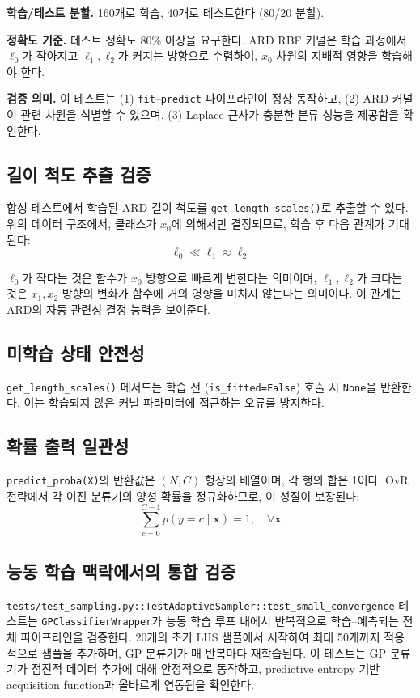 \documentclass[11pt]{article}
\begin{document}
\textbf{학습/테스트 분할.}
160개로 학습, 40개로 테스트한다 (80/20 분할).

\textbf{정확도 기준.}
테스트 정확도 80\% 이상을 요구한다.
ARD RBF 커널은 학습 과정에서 $\ell_0$가 작아지고 $\ell_1, \ell_2$가 커지는 방향으로 수렴하여,
$x_0$ 차원의 지배적 영향을 학습해야 한다.

\textbf{검증 의미.}
이 테스트는 (1) \texttt{fit}--\texttt{predict} 파이프라인이 정상 동작하고,
(2) ARD 커널이 관련 차원을 식별할 수 있으며,
(3) Laplace 근사가 충분한 분류 성능을 제공함을 확인한다.


\subsection{길이 척도 추출 검증}

합성 테스트에서 학습된 ARD 길이 척도를 \texttt{get\_length\_scales()}로 추출할 수 있다.
위의 데이터 구조에서, 클래스가 $x_0$에 의해서만 결정되므로, 학습 후 다음 관계가 기대된다:
\[
\ell_0 \ll \ell_1 \approx \ell_2
\]

$\ell_0$가 작다는 것은 함수가 $x_0$ 방향으로 빠르게 변한다는 의미이며,
$\ell_1, \ell_2$가 크다는 것은 $x_1, x_2$ 방향의 변화가 함수에 거의 영향을 미치지 않는다는 의미이다.
이 관계는 ARD의 자동 관련성 결정 능력을 보여준다.


\subsection{미학습 상태 안전성}

\texttt{get\_length\_scales()} 메서드는 학습 전 (\texttt{is\_fitted=False}) 호출 시 \texttt{None}을 반환한다.
이는 학습되지 않은 커널 파라미터에 접근하는 오류를 방지한다.


\subsection{확률 출력 일관성}

\texttt{predict\_proba(X)}의 반환값은 $(N, C)$ 형상의 배열이며, 각 행의 합은 1이다.
OvR 전략에서 각 이진 분류기의 양성 확률을 정규화하므로, 이 성질이 보장된다:
\[
\sum_{c=0}^{C-1} p(y = c \mid \mathbf{x}) = 1, \quad \forall \mathbf{x}
\]


\subsection{능동 학습 맥락에서의 통합 검증}

\texttt{tests/test\_sampling.py::TestAdaptiveSampler::test\_small\_convergence} 테스트는
\texttt{GPClassifierWrapper}가 능동 학습 루프 내에서 반복적으로 학습--예측되는 전체 파이프라인을 검증한다.
20개의 초기 LHS 샘플에서 시작하여 최대 50개까지 적응적으로 샘플을 추가하며,
GP 분류기가 매 반복마다 재학습된다.
이 테스트는 GP 분류기가 점진적 데이터 추가에 대해 안정적으로 동작하고,
predictive entropy 기반 acquisition function과 올바르게 연동됨을 확인한다.




\end{document}
